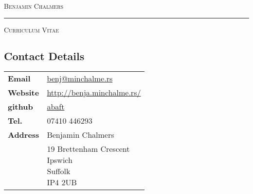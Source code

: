 \documentclass[9pt,a4paper]{article}
\begin{document}
\begin{center}

  \textsc{\Huge{Benjamin Chalmers}}
  \vspace{0.3cm}

  \noindent\rule{0.8\textwidth}{0.4pt}
  \vspace{0.3cm}

  \textsc{\large{Curriculum Vitae}}
  \vspace{0.2cm}

\end{center}
\begin{multicols*}{2}
  \section*{Contact Details} 
\begin{center}
  \begin{tabular}{p{2cm}p{6cm}}
    \textbf{Email}&\href{mailto:benj@minchalme.rs}{benj@minchalme.rs}\\
    \textbf{Website}&\href{http://benja.minchalme.rs/}{http://benja.minchalme.rs/}\\
    \textbf{github}&\href{http://github.com/abaft}{abaft}\\
    \textbf{Tel.}&07410 446293\\
    \textbf{Address}&Benjamin Chalmers\\
    &\parbox{5cm}{19 Brettenham Crescent\\Ipswich\\Suffolk\\IP4 2UB}\\
  \end{tabular}
\end{center}


\end{multicols*}
\end{document}
